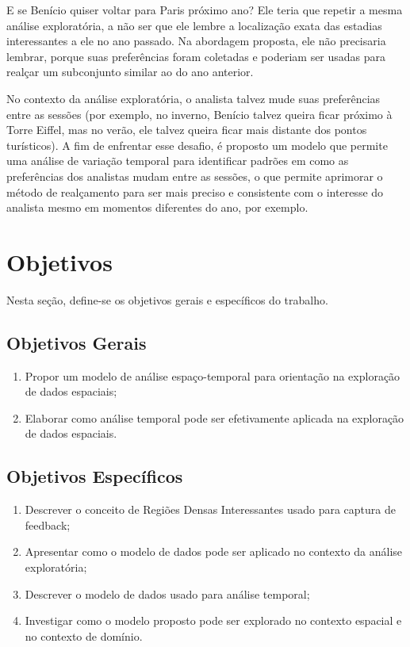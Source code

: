 E se Benício quiser voltar para Paris próximo ano? Ele teria que repetir a mesma análise exploratória, a não ser que ele lembre a localização exata das estadias interessantes a ele no ano passado. Na abordagem proposta, ele não precisaria lembrar, porque suas preferências foram coletadas e poderiam ser usadas para realçar um subconjunto similar ao do ano anterior.

No contexto da análise exploratória, o analista talvez mude suas preferências entre as sessões (por exemplo, no inverno, Benício talvez queira ficar próximo à Torre Eiffel, mas no verão, ele talvez queira ficar mais distante dos pontos turísticos). A fim de enfrentar esse desafio, é proposto um modelo que permite uma análise de variação temporal para identificar padrões em como as preferências dos analistas mudam entre as sessões, o que permite aprimorar o método de realçamento para ser mais preciso e consistente com o interesse do analista mesmo em momentos diferentes do ano, por exemplo.

\section{Objetivos}

Nesta seção, define-se os objetivos gerais e específicos do trabalho.

\subsection{Objetivos Gerais}

\begin{enumerate}[label=\alph*)]
	\tightlist
	\item Propor um modelo de análise espaço-temporal para orientação na exploração de dados espaciais;
	\item Elaborar como análise temporal pode ser efetivamente aplicada na exploração de dados espaciais.
\end{enumerate}

\subsection{Objetivos Específicos}

\begin{enumerate}[label=\alph*)]
	\tightlist
	\item Descrever o conceito de Regiões Densas Interessantes usado para captura de feedback;
	\item Apresentar como o modelo de dados pode ser aplicado no contexto da análise exploratória;
	\item Descrever o modelo de dados usado para análise temporal;
	\item Investigar como o modelo proposto pode ser explorado no contexto espacial e no contexto de domínio.
\end{enumerate}

